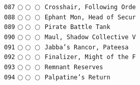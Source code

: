 \documentclass[a4paper,landscape]{article}
\begin{document}
\begin{multicols*}{5}
\texttt{087} \(\bigcirc\!\bigcirc\!\bigcirc\)  \texttt{Crosshair, Following Orde} \vspace{-0.3mm}\\ 
\texttt{088} \(\bigcirc\!\bigcirc\!\bigcirc\)  \texttt{Ephant Mon, Head of Secur} \vspace{-0.3mm}\\ 
\texttt{089} \(\bigcirc\!\bigcirc\!\bigcirc\)  \texttt{Pirate Battle Tank} \vspace{-0.3mm}\\ 
\texttt{090} \(\bigcirc\!\bigcirc\!\bigcirc\)  \texttt{Maul, Shadow Collective V} \vspace{-0.3mm}\\ 
\texttt{091} \(\bigcirc\!\bigcirc\!\bigcirc\)  \texttt{Jabba’s Rancor, Pateesa} \vspace{-0.3mm}\\ 
\texttt{092} \(\bigcirc\!\bigcirc\!\bigcirc\)  \texttt{Finalizer, Might of the F} \vspace{-0.3mm}\\ 
\texttt{093} \(\bigcirc\!\bigcirc\!\bigcirc\)  \texttt{Remnant Reserves} \vspace{-0.3mm}\\ 
\texttt{094} \(\bigcirc\!\bigcirc\!\bigcirc\)  \texttt{Palpatine’s Return} \vspace{-0.3mm}\\ 

\end{multicols*}
\end{document}
